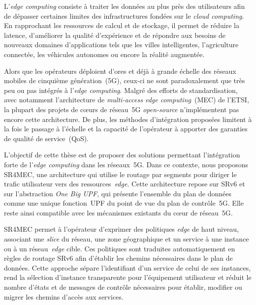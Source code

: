\documentclass[../main.tex]{subfiles}
\begin{document}
\begin{resume}
\begin{frresume}
L’\textit{edge computing} consiste à traiter les données au plus près des utilisateurs afin de dépasser certaines limites des infrastructures fondées sur le \textit{cloud computing}.
En rapprochant les ressources de calcul et de stockage, il permet de réduire la latence, d’améliorer la qualité d’expérience et de répondre aux besoins de nouveaux domaines d’applications tels que les villes intelligentes, l’agriculture connectée, les véhicules autonomes ou encore la réalité augmentée.

Alors que les opérateurs déploient d’ores et déjà à grande échelle des réseaux mobiles de cinquième génération~(5G), ceux-ci ne sont paradoxalement que très peu ou pas intégrés à l’\textit{edge computing}.
Malgré des efforts de standardisation, avec notamment l’architecture de \textit{multi-access edge computing}~(MEC) de l’ETSI, la plupart des projets de cœurs de réseau~5G \textit{open-source} n’implémentent pas encore cette architecture.
De plus, les méthodes d’intégration proposées limitent à la fois le passage à l’échelle et la capacité de l’opérateur à apporter des garanties de qualité de service~(QoS).

L’objectif de cette thèse est de proposer des solutions permettant l’intégration forte de l’\textit{edge computing} dans les réseaux~5G.
Dans ce contexte, nous proposons SR4MEC, une architecture qui utilise le routage par segments pour diriger le trafic utilisateur vers des ressources~\textit{edge}.
Cette architecture repose sur SRv6 et sur l’abstraction \textit{One Big UPF}, qui présente l’ensemble du plan de données comme une unique fonction~UPF du point de vue du plan de contrôle~5G.
Elle reste ainsi compatible avec les mécanismes existants du cœur de réseau~5G.

SR4MEC permet à l’opérateur d’exprimer des politiques \textit{edge} de haut niveau, associant une \textit{slice} du réseau, une zone géographique et un service à une instance ou à un réseau~\textit{edge} cible.
Ces politiques sont traduites automatiquement en règles de routage SRv6 afin d’établir les chemins nécessaires dans le plan de données.
Cette approche sépare l’identifiant d’un service de celui de ses instances, rend la sélection d’instance transparente pour l’équipement utilisateur et réduit le nombre d’états et de messages de contrôle nécessaires pour établir, modifier ou migrer les chemins d’accès aux services.


\end{frresume}
\end{resume}
\end{document}
